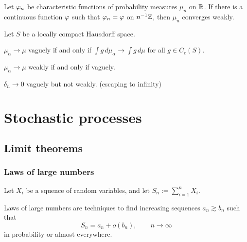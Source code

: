 \documentclass{../../large}
\begin{document}
\begin{prb}
Let $\varphi_n$ be characteristic functions of probability measures $\mu_n$ on $\mathbb{R}$.
If there is a continuous function $\varphi$ such that $\varphi_n=\varphi$ on $n^{-1}\mathbb{Z}$, then $\mu_n$ converges weakly.
\end{prb}


\begin{prb}
\end{prb}


\begin{prb}
Let $S$ be a locally compact Hausdorff space.
\begin{parts}
\item $\mu_\alpha\to\mu$ vaguely if and only if $\int g\,d\mu_\alpha\to\int g\,d\mu$ for all $g\in C_c(S)$.
\item $\mu_\alpha\to\mu$ weakly if and only if vaguely.
\item $\delta_n\to0$ vaguely but not weakly. (escaping to infinity)
\end{parts}
\end{prb}
\begin{pf}
\end{pf}












\part{Stochastic processes}


\chapter{Limit theorems}

\section{Laws of large numbers}

Let $X_i$ be a squence of random variables, and let $S_n:=\sum_{i=1}^nX_i$.

Laws of large numbers are techniques to find increasing sequences $a_n\gtrsim b_n$ such that
\[S_n=a_n+o(b_n),\qquad n\to\infty\]
in probability or almost everywhere.
\end{document}
